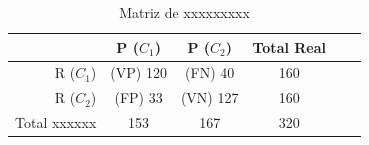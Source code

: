 \begin{table}[!ht]
    \centering
    \caption{Matriz de xxxxxxxxx}
    \label{tab:matriz_de_xxxxxx}
    \vspace{0.5cm}
    \begin{tabular}{r|cccc||c}
        & P ($ C_1 $)   & P ($ C_2 $)   & Total Real \\
        \hline
        \hline
        R ($ C_1 $)             & (VP) 120 & (FN) 40  & 160      \\
        R ($ C_2 $)             & (FP) 33  & (VN) 127 & 160      \\
        \hline
        \hline
        Total xxxxxx & 153 & 167 & 320      \\
        \hline
    \end{tabular}
\end{table}
